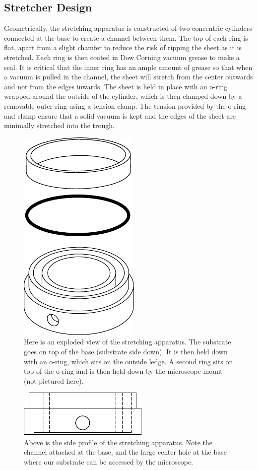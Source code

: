 \subsection{Stretcher Design}
Geometrically, the stretching apparatus is constructed of two concentric cylinders connected at the base to create a channel between them. The top of each ring is flat, apart from a slight chamfer to reduce the risk of ripping the sheet as it is stretched. Each ring is then coated in Dow Corning vacuum grease to make a seal. It is critical that the inner ring has an ample amount of grease so that when a vacuum is pulled in the channel, the sheet will stretch from the center outwards  and not from the edges inwards. The sheet is held in place with an o-ring wrapped around the outside of the cylinder, which is then clamped down by a removable outer ring using a tension clamp. The tension provided by the o-ring and clamp ensure that a solid vacuum is kept and the edges of the sheet are minimally stretched into the trough.

\begin{figure}[h!]
	\centering
	\includegraphics[width=.4\linewidth]{Chapters/Figures/exploded_stretcher}
	\caption[Stretching Apparatus Design]{Here is an exploded view of the stretching apparatus. The substrate goes on top of the base (substrate side down). It is then held down with an o-ring, which sits on the outside ledge. A second ring sits on top of the o-ring and is then held down by the microscope mount (not pictured here).}
	\label{fig:explodedstretcher}
\end{figure}
\begin{figure}[h!]
	\centering
	\includegraphics[width=0.6\linewidth]{Chapters/Figures/stretcher_side}
	\caption[Side Profile of Stretching Apparatus]{Above is the side profile of the stretching apparatus. Note the channel attached at the base, and the large center hole at the base where our substrate can be accessed by the microscope.}
	\label{fig:stretcherside}
\end{figure}


